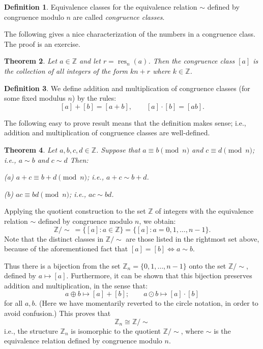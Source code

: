 \documentclass[11pt]{article}
\newtheorem{thm}{Theorem}[section]
\theoremstyle{definition}
\newtheorem{defn}[thm]{Definition}
\newcommand{\Z}{\mathbb{Z}} %
\renewcommand{\iff}{\Leftrightarrow}
\newcommand{\res}{\operatorname{res}}
\begin{document}
\begin{defn}
  Equivalence classes for the equivalence relation $\sim$ defined by
  congruence modulo $n$ are called \emph{congruence classes}.
\end{defn}


The following gives a nice characterization of the numbers in a
congruence class. The proof is an exercise.

\begin{thm}\label{thm:cong-form}
  Let $a \in \Z$ and let $r = \res_n(a)$. Then the congruence class
  $[a]$ is the collection of all integers of the form $kn+r$ where
  $k \in \Z$.
\end{thm}

\begin{defn}
We define addition and multiplication of congruence classes (for some
fixed modulus $n$) by the rules:
\[
  [a]+[b] = [a+b], \qquad [a]\cdot[b] = [a b].
\]
\end{defn}


The following easy to prove result means that the definition makes
sense; i.e., addition and multiplication of congruence classes are
well-defined.


\begin{thm}\label{thm:cong-prop-2} 
Let $a,b,c,d \in \Z$. Suppose that $a \equiv b \pmod{n}$ and $c \equiv
d \pmod{n}$; i.e., $a \sim b$ and $c \sim d$ Then:

(a) $a+c \equiv b+d \pmod{n}$; i.e., $a+c \sim b+d$.

(b) $ac \equiv bd \pmod{n}$; i.e., $ac \sim bd$.
\end{thm}



Applying the quotient construction to the set $\Z$ of integers with the
equivalence relation $\sim$ defined by congruence modulo $n$, we
obtain:
\[
  \Z/\!\!\sim \ = \{ [a] : a \in \Z \} = \{ [a] : a = 0, 1, \dots, n-1
  \}.
\]
Note that the distinct classes in $\Z/\!\!\sim$ are those listed in
the rightmost set above, because of the aforementioned fact that $[a]
= [b] \iff a \sim b$.

Thus there is a bijection from the set $\Z_n = \{0, 1, \dots, n-1 \}$
onto the set $\Z/\!\!\sim$, defined by $a \mapsto [a]$. Furthermore,
it can be shown that this bijection preserves addition and
multiplication, in the sense that:
\[
  a \oplus b \mapsto [a]+[b]; \qquad a \odot b \mapsto [a]\cdot [b]
\]
for all $a,b$. (Here we have momentarily reverted to the circle
notation, in order to avoid confusion.) This proves that
\[
  \Z_n \cong \Z/\!\!\sim
\]
i.e., the structure $\Z_n$ is isomorphic to the quotient
$\Z/\!\!\sim$, where $\sim$ is the equivalence relation defined by
congruence modulo $n$.
\end{document}

